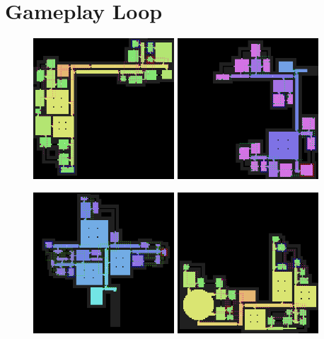 \documentclass[11pt,a4paper]{article}
\begin{document}
\section{Gameplay Loop}

\begin{figure}
    \center
    \includegraphics[width=0.47\textwidth]{level1.png}
    \hfill
    \includegraphics[width=0.47\textwidth]{level2.png}

    \vspace{0.5cm}

    \includegraphics[width=0.47\textwidth]{level4.png}
    \hfill
    \includegraphics[width=0.47\textwidth]{level3.png}


\end{figure}
\end{document}

